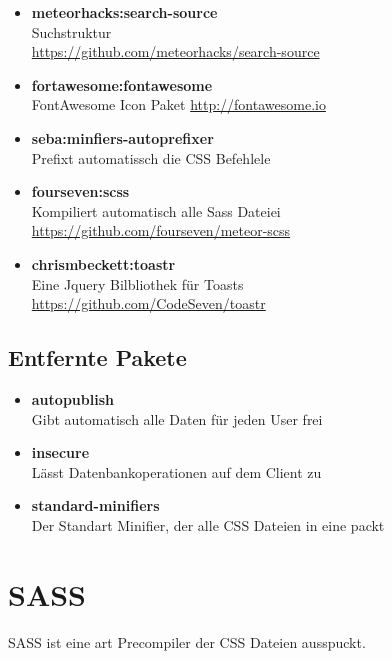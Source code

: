 \documentclass[Info_VK_Website_Dokumentation.tex]{subfiles}
\begin{document}
\begin{itemize}
 	\item \textbf{meteorhacks:search-source}\\
 	Suchstruktur \\
 	\small \url{https://github.com/meteorhacks/search-source}

 	\item \textbf{fortawesome:fontawesome}\\
 	FontAwesome Icon Paket
 	\small \url{http://fontawesome.io} 

 	\item \textbf{seba:minfiers-autoprefixer}\\
 	Prefixt automatissch die CSS Befehlele

 	\item \textbf{fourseven:scss}\\
 	Kompiliert automatisch alle Sass Dateiei \\
 	\small \url{https://github.com/fourseven/meteor-scss} 

 	\item \textbf{chrismbeckett:toastr}\\
 	Eine Jquery Bilbliothek für Toasts \\
 	\small \url{https://github.com/CodeSeven/toastr} 
 \end{itemize} 

\subsection{Entfernte Pakete}

\begin{itemize}
 	\item \textbf{autopublish}\\
 	Gibt automatisch alle Daten für jeden User frei
 	\item \textbf{insecure}\\
 	Lässt Datenbankoperationen auf dem Client zu
 	\item \textbf{standard-minifiers}\\
 	Der Standart Minifier, der alle CSS Dateien in eine packt
 \end{itemize} 



\section{SASS}

SASS ist eine art Precompiler der CSS Dateien ausspuckt.
\end{document}
